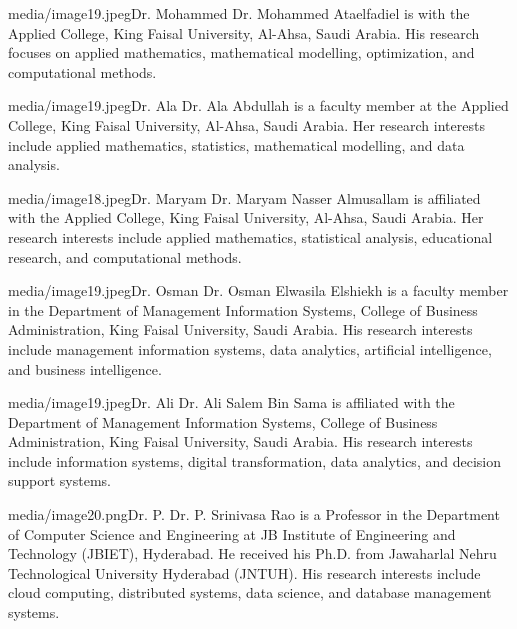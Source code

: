 \documentclass[10pt]{NSP1}
\begin{document}
\begin{biographyps}{media/image19.jpeg}{Dr. Mohammed}
Dr. Mohammed Ataelfadiel is with the Applied College, King Faisal University, Al-Ahsa, Saudi Arabia. His research focuses on applied mathematics, mathematical modelling, optimization, and computational methods.\end{biographyps}

\begin{biographyps}{media/image19.jpeg}{Dr. Ala}
Dr. Ala Abdullah is a faculty member at the Applied College, King Faisal University, Al-Ahsa, Saudi Arabia. Her research interests include applied mathematics, statistics, mathematical modelling, and data analysis.\end{biographyps}

\begin{biographyps}{media/image18.jpeg}{Dr. Maryam}
Dr. Maryam Nasser Almusallam is affiliated with the Applied College, King Faisal University, Al-Ahsa, Saudi Arabia. Her research interests include applied mathematics, statistical analysis, educational research, and computational methods.\end{biographyps}

\begin{biographyps}{media/image19.jpeg}{Dr. Osman}
Dr. Osman Elwasila Elshiekh is a faculty member in the Department of Management Information Systems, College of Business Administration, King Faisal University, Saudi Arabia. His research interests include management information systems, data analytics, artificial intelligence, and business intelligence.\end{biographyps}

\begin{biographyps}{media/image19.jpeg}{Dr. Ali}
Dr. Ali Salem Bin Sama is affiliated with the Department of Management Information Systems, College of Business Administration, King Faisal University, Saudi Arabia. His research interests include information systems, digital transformation, data analytics, and decision support systems.\end{biographyps}

\begin{biographyps}{media/image20.png}{Dr. P.}
Dr. P. Srinivasa Rao is a Professor in the Department of Computer Science and Engineering at JB Institute of Engineering and Technology (JBIET), Hyderabad. He received his Ph.D. from Jawaharlal Nehru Technological University Hyderabad (JNTUH). His research interests include cloud computing, distributed systems, data science, and database management systems.\end{biographyps}
\end{document}
